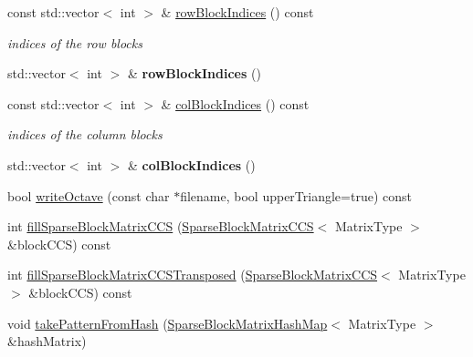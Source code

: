 \begin{DoxyCompactItemize}
\item 
\hypertarget{classg2o_1_1SparseBlockMatrix_ab9f9e621c9bca7c660c61b3948b8ece3}{const std\-::vector$<$ int $>$ \& \hyperlink{classg2o_1_1SparseBlockMatrix_ab9f9e621c9bca7c660c61b3948b8ece3}{row\-Block\-Indices} () const }\label{classg2o_1_1SparseBlockMatrix_ab9f9e621c9bca7c660c61b3948b8ece3}

\begin{DoxyCompactList}\small\item\em indices of the row blocks \end{DoxyCompactList}\item 
\hypertarget{classg2o_1_1SparseBlockMatrix_a03a2cfdb856c2dac4875889d55ecda84}{std\-::vector$<$ int $>$ \& {\bfseries row\-Block\-Indices} ()}\label{classg2o_1_1SparseBlockMatrix_a03a2cfdb856c2dac4875889d55ecda84}

\item 
\hypertarget{classg2o_1_1SparseBlockMatrix_adfaf13a5f3134205a58c8346a09a672a}{const std\-::vector$<$ int $>$ \& \hyperlink{classg2o_1_1SparseBlockMatrix_adfaf13a5f3134205a58c8346a09a672a}{col\-Block\-Indices} () const }\label{classg2o_1_1SparseBlockMatrix_adfaf13a5f3134205a58c8346a09a672a}

\begin{DoxyCompactList}\small\item\em indices of the column blocks \end{DoxyCompactList}\item 
\hypertarget{classg2o_1_1SparseBlockMatrix_aba255bdbb8e0a0d2802ae27e6d4f7cc7}{std\-::vector$<$ int $>$ \& {\bfseries col\-Block\-Indices} ()}\label{classg2o_1_1SparseBlockMatrix_aba255bdbb8e0a0d2802ae27e6d4f7cc7}

\item 
bool \hyperlink{classg2o_1_1SparseBlockMatrix_a58a311fa5e66df880b29c8abb631474e}{write\-Octave} (const char $\ast$filename, bool upper\-Triangle=true) const 
\item 
int \hyperlink{classg2o_1_1SparseBlockMatrix_a1f596d1bd27de9f62282eee7e65a9f27}{fill\-Sparse\-Block\-Matrix\-C\-C\-S} (\hyperlink{classg2o_1_1SparseBlockMatrixCCS}{Sparse\-Block\-Matrix\-C\-C\-S}$<$ Matrix\-Type $>$ \&block\-C\-C\-S) const 
\item 
int \hyperlink{classg2o_1_1SparseBlockMatrix_a0fbc51ac6aebfceed54a6eb75d2f3ab2}{fill\-Sparse\-Block\-Matrix\-C\-C\-S\-Transposed} (\hyperlink{classg2o_1_1SparseBlockMatrixCCS}{Sparse\-Block\-Matrix\-C\-C\-S}$<$ Matrix\-Type $>$ \&block\-C\-C\-S) const 
\item 
void \hyperlink{classg2o_1_1SparseBlockMatrix_a0b1e9dc3a24b0ab41d7002396a61c833}{take\-Pattern\-From\-Hash} (\hyperlink{classg2o_1_1SparseBlockMatrixHashMap}{Sparse\-Block\-Matrix\-Hash\-Map}$<$ Matrix\-Type $>$ \&hash\-Matrix)
\end{DoxyCompactItemize}
